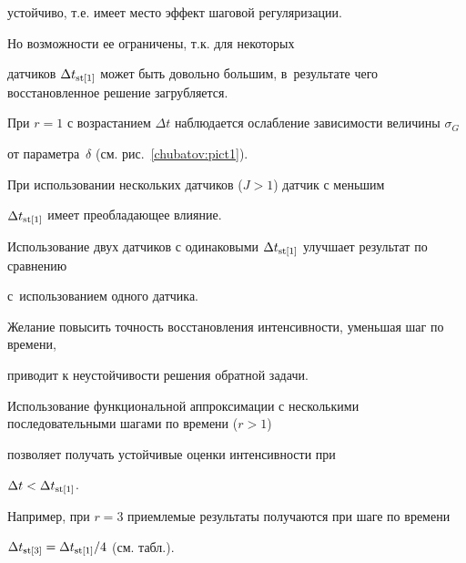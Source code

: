 устойчиво,  т.е. имеет место эффект шаговой регуляризации.


 Но возможности ее ограничены,  т.к. для некоторых


датчиков $\Delta t_{\rm st[1]}$ может быть довольно большим, в~результате чего восстановленное решение загрубляется.


 При ${r=1}$ с возрастанием $\Delta t$ наблюдается ослабление зависимости величины $\sigma_G$


 от параметра~$\delta$ (см. рис.~\ref{chubatov:pict1}).


 При использовании нескольких датчиков ($J>1$) датчик с меньшим


$\Delta t_{\rm st[1]}$ имеет преобладающее влияние.


 Использование двух датчиков с одинаковыми $\Delta t_{\rm st[1]}$ улучшает результат по сравнению 


с~использованием одного датчика.





 Желание повысить точность восстановления интенсивности,  уменьшая шаг по времени, 


приводит к неустойчивости решения обратной задачи.


 Использование функциональной аппроксимации с несколькими последовательными шагами по времени ($r>1$)


позволяет получать устойчивые оценки интенсивности при


 $\Delta t < \Delta t_{\rm st[1]}$.


 Например,  при $r=3$ приемлемые результаты получаются при шаге по времени


  ${ \Delta t_{\rm st[3]}=\Delta t_{\rm st[1]}/4 }$ (см. табл.).





